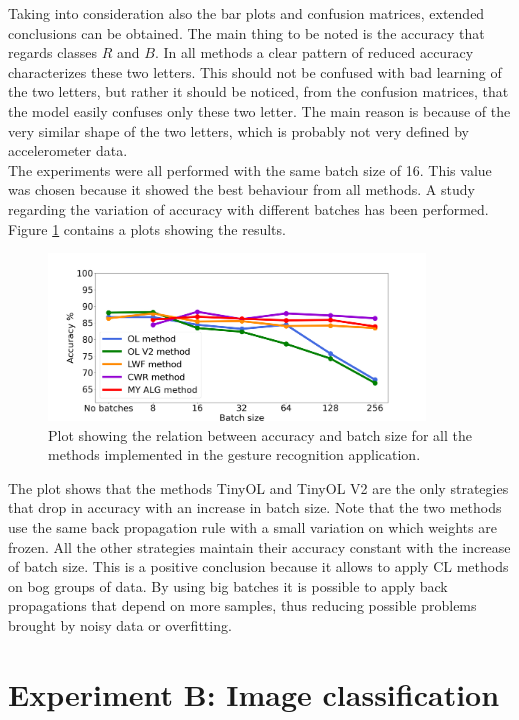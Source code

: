 \documentclass[12pt]{report}
\begin{document}
Taking into consideration also the bar plots and confusion matrices, extended conclusions can be obtained. The main thing to be noted is the accuracy that regards classes $R$ and $B$. In all methods a clear pattern of reduced accuracy characterizes these two letters. This should not be confused with bad learning of the two letters, but rather it should be noticed, from the confusion matrices, that the model easily confuses only these two letter. The main reason is because of the very similar shape of the two letters, which is probably not very defined by accelerometer data.\\ 

The experiments were all performed with the same batch size of 16. This value was chosen because it showed the best behaviour from all methods. A study regarding the variation of accuracy with different batches has been performed. Figure \ref{fig:batch_size_letter} contains a plots showing the results.

\begin{figure}[h!]
    \centering
    \includegraphics[width=100mm]{Figures/Chapter5/batch_size_letters.png} 
    \caption{Plot showing the relation between accuracy and batch size for all the methods implemented in the gesture recognition application.}
    \label{fig:batch_size_letter}    
\end{figure}

The plot shows that the methods TinyOL and TinyOL V2 are the only strategies that drop in accuracy with an increase in batch size. Note that the two methods use the same back propagation rule with a small variation on which weights are frozen. All the other strategies maintain their accuracy constant with the increase of batch size. This is a positive conclusion because it allows to apply CL methods on bog groups of data. By using big batches it is possible to apply back propagations that depend on more samples, thus reducing possible problems brought by noisy data or overfitting.

\section{Experiment B: Image classification}
\end{document}
